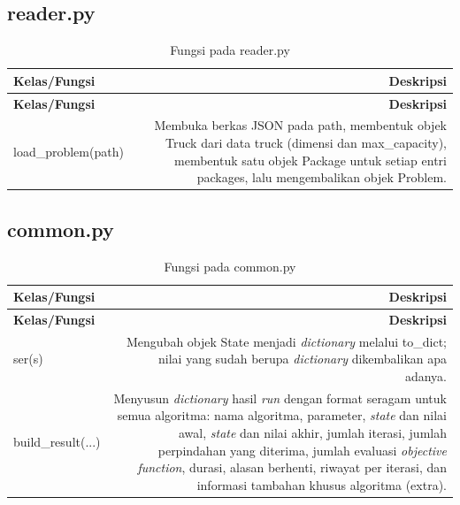 
\subsection{reader.py}

\begin{longtable}{|K|D|}
\caption{Fungsi pada reader.py}
\label{tab:reader} \\
\hline
\textbf{Kelas/Fungsi} & \textbf{Deskripsi} \\
\hline
\endfirsthead
\hline
\textbf{Kelas/Fungsi} & \textbf{Deskripsi} \\
\hline
\endhead
\hline
\endlastfoot
load\_problem(path) & Membuka berkas JSON pada path, membentuk objek Truck dari data truck (dimensi dan max\_capacity), membentuk satu objek Package untuk setiap entri packages, lalu mengembalikan objek Problem. \\ \hline
\end{longtable}


\subsection{common.py}

\begin{longtable}{|K|D|}
\caption{Fungsi pada common.py}
\label{tab:common} \\
\hline
\textbf{Kelas/Fungsi} & \textbf{Deskripsi} \\
\hline
\endfirsthead
\hline
\textbf{Kelas/Fungsi} & \textbf{Deskripsi} \\
\hline
\endhead
\hline
\endlastfoot
ser(s) & Mengubah objek State menjadi \textit{dictionary} melalui to\_dict; nilai yang sudah berupa \textit{dictionary} dikembalikan apa adanya. \\ \hline
build\_result(...) & Menyusun \textit{dictionary} hasil \textit{run} dengan format seragam untuk semua algoritma: nama algoritma, parameter, \textit{state} dan nilai awal, \textit{state} dan nilai akhir, jumlah iterasi, jumlah perpindahan yang diterima, jumlah evaluasi \textit{objective function}, durasi, alasan berhenti, riwayat per iterasi, dan informasi tambahan khusus algoritma (extra). \\ \hline
\end{longtable}


